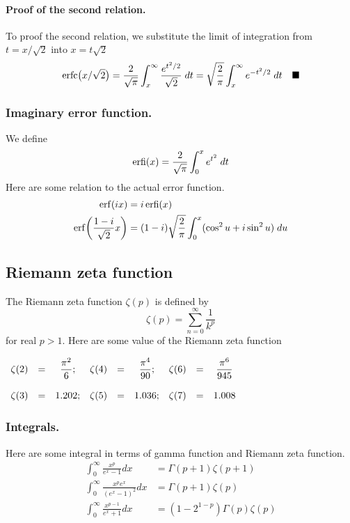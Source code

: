 \documentclass[../../main.tex]{subfiles}
\begin{document}
\paragraph{Proof of the second relation.} To proof the second relation, we substitute the limit of integration from $t=x/\sqrt{2}$ into $x=t\sqrt{2}$
\begin{align*}
    \operatorname{erfc}\bigl(x/\sqrt{2}\bigr)=\frac{2}{\sqrt{\pi}}\int_{x}^{\infty}\frac{e^{t^2/2}}{\sqrt{2}}\;dt=\sqrt{\frac{2}{\pi}}\int_{x}^{\infty}e^{-t^2/2}\;dt\quad\blacksquare
\end{align*}

\subsubsection*{Imaginary error function.} We deﬁne
\begin{equation*}
    \operatorname{erfi}(x)=\frac{2}{\sqrt{\pi}}\int_{0}^{x}e^{t^2}\;dt
\end{equation*}
Here are some relation to the actual error function.
\begin{align*}
    \operatorname{erf}(ix)&=i\operatorname{erfi}(x)\\
    \operatorname{erf}\biggl(\frac{1-i }{\sqrt{2}}x\biggr)&=(1-i   )\sqrt{\frac{2}{\pi}}\int_{0}^{x}(\cos^2u+i\sin^2u)\;du
\end{align*}

\subsection*{Riemann zeta function}
The Riemann zeta function \(\zeta(p)\) is defined by
\begin{equation*}
    \zeta(p)=\sum_{n=0}^{\infty}\frac{1}{k^p}
\end{equation*}
for real $p>1$. Here are some value of the Riemann zeta function
\begin{center}
    $\begin{array}{c c c c c c c c c}
        \zeta(2)&=&\dfrac{\pi^2}{6};& \zeta(4)&=&\dfrac{\pi^4}{90}; & \zeta(6)&= &\dfrac{\pi^6}{945}\\\\
        \zeta(3)&=&1.202;&  \zeta(5)&=&1.036;& \zeta(7)&=&1.008 \\
    \end{array}$
\end{center}

\subsubsection*{Integrals.} Here are some integral in terms of gamma function and Riemann zeta function.
\begin{align*}
    \int_{0}^{\infty}\frac{x^p}{e^x-1}dx&=\Gamma(p+1)\zeta(p+1)\\
    \int_{0}^{\infty}\frac{x^pe^x}{\left(e^x-1\right)^2}dx&= \Gamma(p+1)\zeta(p)\\
    \int_{0}^{\infty}\frac{x^{p-1}}{e^x+1}dx& = \left(1-2^{1-p}\right)\Gamma(p) \zeta(p)
\end{align*}
\end{document}
